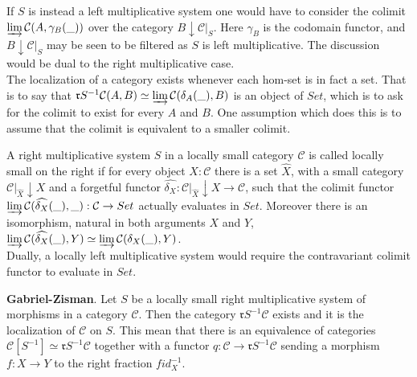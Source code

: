     If $S$ is instead a left multiplicative system one would have to consider the colimit $\varinjlim \mathcal{C}(A,\gamma_B(\_))$ over the category $B\downarrow \mathcal{C}|_{S}$. Here $\gamma_B$ is the codomain functor, and $B\downarrow \mathcal{C}|_{S}$ may be seen to be filtered as $S$ is left multiplicative. The discussion would be dual to the right multiplicative case. \\
 
    The localization of a category exists whenever each hom-set is in fact a set. That is to say that $\mathfrak{r}S^{-1}\mathcal{C}(A,B)\simeq\varinjlim\mathcal{C}(\delta_A(\_),B)$ is an object of $Set$, which is to ask for the colimit to exist for every $A$ and $B$. One assumption which does this is to assume that the colimit is equivalent to a smaller colimit.

    \begin{definition}
        A right multiplicative system $S$ in a locally small category $\mathcal{C}$ is called locally small on the right if for every object $X:\mathcal{C}$ there is a set $\widehat{X}$, with a small category $\mathcal{C}|_{\widehat{X}}\downarrow X$ and a forgetful functor $\widehat{\delta_X} : \mathcal{C}|_{\widehat{X}}\downarrow X \rightarrow \mathcal{C}$, such that the colimit functor $\varinjlim\mathcal{C}(\widehat{\delta_X}(\_),\_) : \mathcal{C} \rightarrow Set$ actually evaluates in $Set$. Moreover there is an isomorphism, natural in both arguments $X$ and $Y$, $\varinjlim\mathcal{C}(\widehat{\delta_X}(\_),Y)\simeq\varinjlim\mathcal{C}(\delta_X(\_),Y)$. \\

        Dually, a locally left multiplicative system would require the contravariant colimit functor to evaluate in $Set$.
    \end{definition}

    \begin{theorem}
        \textbf{Gabriel-Zisman}. Let $S$ be a locally small right multiplicative system of morphisms in a category $\mathcal{C}$. Then the category $\mathfrak{r}S^{-1}\mathcal{C}$ exists and it is the localization of $\mathcal{C}$ on $S$. This mean that there is an equivalence of categories $\mathcal{C}[S^{-1}]\simeq\mathfrak{r}S^{-1}\mathcal{C}$ together with a functor $q: \mathcal{C}\rightarrow\mathfrak{r}S^{-1}\mathcal{C}$ sending a morphism $f : X\rightarrow Y$ to the right fraction $fid_X^{-1}$.
    \end{theorem}

